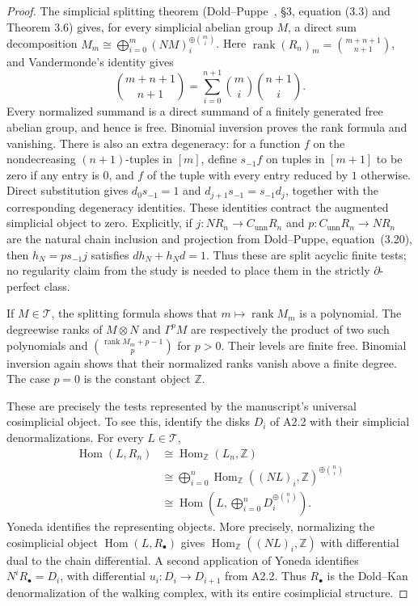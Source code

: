\begin{proof}
The simplicial splitting theorem (Dold--Puppe~\cite{DoldPuppe1961}, \S3, equation (3.3) and Theorem 3.6) gives, for every simplicial abelian
group $M$, a direct sum decomposition
$M_m\cong\bigoplus_{i=0}^m (NM)_i^{\oplus\binom mi}$.
Here $\operatorname{rank}(R_n)_m=\binom{m+n+1}{n+1}$, and Vandermonde's
identity gives
\[
 \binom{m+n+1}{n+1}
 =\sum_{i=0}^{n+1}\binom mi\binom{n+1}i.
\]
Every normalized summand is a direct summand of a finitely generated
free abelian group, and hence is free. Binomial inversion proves the
rank formula and vanishing. There is also an extra degeneracy:
for a function $f$ on the nondecreasing $(n+1)$-tuples in $[m]$, define
$s_{-1}f$ on tuples in $[m+1]$ to be zero if any entry is $0$, and
$f$ of the tuple with every entry reduced by $1$ otherwise. Direct
substitution gives $d_0s_{-1}=1$ and
$d_{j+1}s_{-1}=s_{-1}d_j$, together with the corresponding degeneracy
identities. These identities contract the augmented simplicial object
to zero. Explicitly, if $j:N R_n\to C_{\mathrm{unn}}R_n$ and
$p:C_{\mathrm{unn}}R_n\to NR_n$ are the natural chain inclusion and
projection from Dold--Puppe, equation~(3.20), then
$h_N=p s_{-1}j$ satisfies $dh_N+h_Nd=1$.
Thus these are split acyclic finite tests; no regularity claim from the
study is needed to place them in the strictly $\partial$-perfect class.

If $M\in\mathcal T$, the splitting formula shows that
$m\mapsto\operatorname{rank}M_m$ is a polynomial. The degreewise ranks
of $M\otimes N$ and $\Gamma^pM$ are respectively the product of two
such polynomials and
$\binom{\operatorname{rank}M_m+p-1}{p}$ for $p>0$.
Their levels are finite free. Binomial inversion again shows that their
normalized ranks vanish above a finite degree. The case $p=0$ is the
constant object $\mathbb Z$.

These are precisely the tests represented by the manuscript's universal
cosimplicial object. To see this, identify the disks $D_i$ of A2.2
with their simplicial denormalizations. For every $L\in\mathcal T$,
\begin{align*}
 \operatorname{Hom}(L,R_n)
 &\cong\operatorname{Hom}_{\mathbb Z}(L_n,\mathbb Z)\\
 &\cong\bigoplus_{i=0}^n
 \operatorname{Hom}_{\mathbb Z}((NL)_i,\mathbb Z)^{\oplus\binom ni}
 \\&\cong\operatorname{Hom}\left(L,
       \bigoplus_{i=0}^n D_i^{\oplus\binom ni}\right).
\end{align*}
Yoneda identifies the representing objects. More precisely, normalizing
the cosimplicial object $\operatorname{Hom}(L,R_\bullet)$ gives
$\operatorname{Hom}_{\mathbb Z}((NL)_i,\mathbb Z)$ with differential
dual to the chain differential. A second application of Yoneda
identifies $N^iR_\bullet=D_i$, with differential $u_i:D_i\to D_{i+1}$
from A2.2. Thus $R_\bullet$ is the Dold--Kan denormalization of the
walking complex, with its entire cosimplicial structure.
\end{proof}

